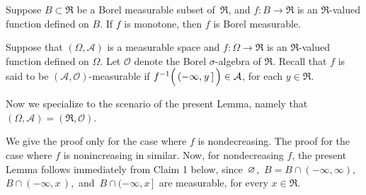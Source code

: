 
\begin{lemma}\label{lemma:MonotoneFunctionsAreMeasurable}
\mbox{}\vskip 0.1cm
\noindent
Suppose $B \subset \Re$ be a Borel measurable subset of \,$\Re$, and
$f : B \longrightarrow \Re$ is an $\Re$-valued function defined on $B$.
If $f$ is monotone, then $f$ is Borel measurable.
\end{lemma}
\proof
Suppose that $(\Omega,\mathcal{A})$ is a measurable space and
$f : \Omega \longrightarrow \Re$ is an $\Re$-valued function defined on $\Omega$.
Let $\mathcal{O}$ denote the Borel $\sigma$-algebra of $\Re$.
Recall that $f$ is said to be $(\mathcal{A},\mathcal{O})$-measurable if
$f^{-1}\!\left(\,(-\infty,\overset{{\color{white}-}}{y}\,]\,\right) \in \mathcal{A}$,
for each $y \in \Re$.

\vskip 0.3cm
\noindent
Now we specialize to the scenario of the present Lemma, namely that
$(\Omega,\mathcal{A}) = (\Re,\mathcal{O})$.

\vskip 0.3cm
\noindent
We give the proof only for the case where $f$ is nondecreasing.
The proof for the case where $f$ is nonincreasing in similar.
Now, for nondecreasing $f$, the present Lemma follows immediately
from Claim 1 below, since \,$\varnothing$, \,$B = B \cap (-\infty,\infty)$,
\,$B \cap (-\infty,x\,)$,\, and \,$B \cap (-\infty,x\,]$\, are measurable, for every $x\in\Re$.


